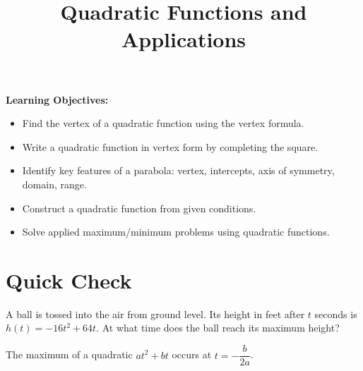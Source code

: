 \documentclass{ximera}
\title{Quadratic Functions and Applications}
\begin{document}
\begin{abstract}
\end{abstract}
\maketitle

\textbf{Learning Objectives:}
\begin{itemize}
  \item Find the vertex of a quadratic function using the vertex formula.
  \item Write a quadratic function in vertex form by completing the square.
  \item Identify key features of a parabola: vertex, intercepts, axis of symmetry, domain, range.
  \item Construct a quadratic function from given conditions.
  \item Solve applied maximum/minimum problems using quadratic functions.
\end{itemize}
\medskip

\section*{Quick Check}

\begin{problem}
A ball is tossed into the air from ground level. Its height in feet after $t$ seconds is $h(t) = -16t^2 + 64t$. At what time does the ball reach its maximum height?
\begin{hint}
The maximum of a quadratic $at^2+bt$ occurs at $t = -\dfrac{b}{2a}$.
\end{hint}
\begin{multipleChoice}
\end{multipleChoice}
\end{problem}
\end{document}
